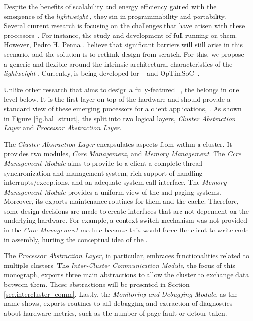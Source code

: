 	Despite the benefits of scalability and energy efficiency gained with the
	emergence of the \textit{lightweight \manycores}, they sin in programmability
	and portability.
	Several current research is focusing on the challenges that have arisen with
	these processors~\cite{}.
	For instance, the study and development of full \oses running on them.
	However, Pedro H. Penna \etal. believe that significant barriers will still
	arise in this scenario, and the solution is to rethink \os design from scratch.
	For this, we propose a generic and flexible \hal around the intrinsic
	architectural characteristics of the \textit{lightweight \manycores}.
	Currently, \hal is being developed for \mppa~\cite{} and OpTimSoC~\cite{}.

	Unlike other research that aims to design a fully-featured \os~\cite{},
	the \hal belongs in one level below.
	It is the first layer on top of the hardware and should provide a standard
	view of these emerging processors for a client applications, \ie \os.
	As shown in Figure \ref{fig.hal_struct}, the \hal split into two logical layers,
	\textit{Cluster Abstraction Layer} and \textit{Processor Abstraction Layer}.

	The \textit{Cluster Abstraction Layer} encapsulates aspects from within a cluster.
	It provides two modules, \textit{Core Management}, and \textit{Memory Management}.
	The \textit{Core Management Module} aims to provide to a client \os a complete
	thread synchronization and management system, rich support of handling
	interrupts/exceptions, and an adequate system call interface.
	The \textit{Memory Management Module} provides a uniform view of the \tlbs
	and paging systems.
	Moreover, its exports maintenance routines for them and the cache.
	Therefore, some design decisions are made to create interfaces that are not
	dependent on the underlying hardware.
	For example, a context switch mechanism was not provided in the
	\textit{Core Management} module because this would force the client \os
	to write code in assembly, hurting the conceptual idea of the \hal.

	The \textit{Processor Abstraction Layer}, in particular, embraces
	functionalities related to multiple clusters.
	The \textit{Inter-Cluster Communication Module}, the focus of
	this monograph, exports three main abstractions to allow the
	cluster to exchange data between them.
	These abstractions will be presented in Section \ref{sec.intercluster_comm}.
	Lastly, the \textit{Monitoring and Debugging Module}, as the
	name shows, exports routines to aid debugging and extraction
	of diagnostics about hardware metrics, such as the number of
	page-fault or detour taken.

